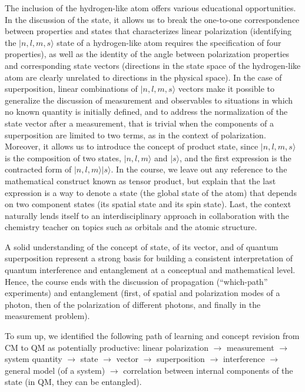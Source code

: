 \documentclass[twocolumn,secnumarabic,amssymb, nobibnotes, aps, prd, nofootinbib]{revtex4-2}
\begin{document}
The inclusion of the hydrogen-like atom offers various educational opportunities. In the discussion of the state, it allows us to break the one-to-one correspondence between properties and states that characterizes linear polarization (identifying the $|n, l, m, s \rangle$ state of a hydrogen-like atom requires the specification of four properties), as well as the identity of the angle between polarization properties and corresponding state vectors  (directions in the state space of the hydrogen-like atom are clearly unrelated to directions in the physical space). In the case of superposition, linear combinations of $|n, l, m, s \rangle$ vectors make it possible to generalize the discussion of measurement and observables to situations in which no known quantity is initially defined, and to address the normalization of the state vector after a measurement, that is trivial when the components of a superposition are limited to two terms, as in the context of polarization. Moreover, it allows us to introduce the concept of product state, since $|n, l, m, s \rangle$ is the composition of two states, $|n, l, m\rangle$ and $|s \rangle$, and the first expression is the contracted form of $|n, l, m\rangle|s\rangle$. In the course, we leave out any reference to the mathematical construct known as tensor product, but explain that the last expression is a way to denote a state (the global state of the atom) that depends on two component states (its spatial state and its spin state). Last, the context naturally lends itself to an interdisciplinary approach in collaboration with the chemistry teacher on topics such as orbitals and the atomic structure.

A solid understanding of the concept of state, of its vector, and of quantum superposition represent a strong basis for building a consistent interpretation of quantum interference and entanglement at a conceptual and mathematical level. Hence, the course ends with the discussion of propagation (``which-path'' experiments) and entanglement (first, of spatial and polarization modes of a photon, then of the polarization of different photons, and finally in the measurement problem).

To sum up, we identified the following path of learning and concept revision from CM to QM as potentially productive: linear polarization $\rightarrow$ measurement  $\rightarrow$ system quantity $\rightarrow$ state $\rightarrow$ vector $\rightarrow$ superposition $\rightarrow$ interference $\rightarrow$ general model (of a system) $\rightarrow$ correlation between internal components of the state (in QM, they can be entangled).
\end{document}
